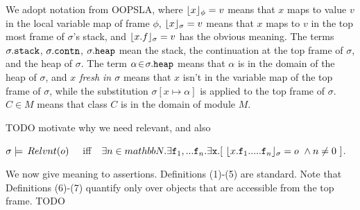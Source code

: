 We adopt notation from OOPSLA, where
 $\lfloor x \rfloor_{\phi} = v$  means that $x$ maps to
value $v$ in the local variable map of frame $\phi$, $\lfloor x \rfloor_{\sigma} = v$ means that $x$ 
maps to $v$ in the top most frame of $\sigma$'s stack, and $\lfloor x.f \rfloor_{\sigma} = v$
has the obvious meaning. The terms $\sigma.{\texttt{stack}}$,  
$\sigma.{\texttt{contn}}$,  
$\sigma.{\texttt{heap}}$     mean the stack, 
the continuation at the
top frame of $\sigma$, %
and the heap of $\sigma$.
The term $\alpha\!\in\!\sigma.{\texttt{heap}}$ means that $\alpha$ is in the domain of the heap of $\sigma$, and \emph{$x$ fresh in $\sigma$} means that 
$x$ isn't in the variable map of the top frame of $\sigma$, 
while the substitution  $\sigma[x \mapsto \alpha]$ is applied to the top frame of $\sigma$.
 \ $C\in M$ means that class $C$ is in the domain of module $M$. 

TODO motivate why we need relevant, and also 
\begin{definition}
$\sigma \models \,Relvnt(o)$ \ \ iff\ \  
$\exists n\in mathbb{N}.\exists \prg{f}_1,... \prg{f}_n.\exists \prg{x}.[ \ \interpret{\sigma}{x.\prg{f}_1.....\prg{f}_n} = o \ \wedge n\neq 0\ ]$.
\end{definition}

We now give meaning to assertions. Definitions (1)-(5) are standard. Note that Definitions (6)-(7) quantify only over objects that are accessible from the top frame. TODO  

